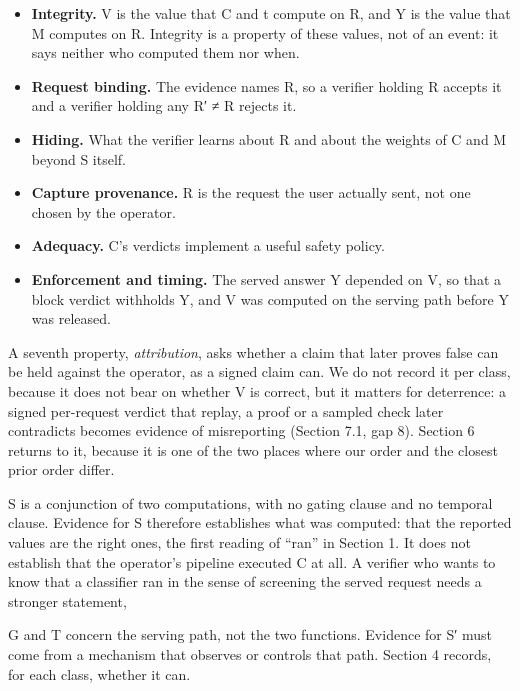 \documentclass[11pt]{article}
\begin{document}
\begin{itemize}
\item \textbf{Integrity.} V is the value that C and t compute on R, and Y is the value that M computes on R. Integrity is a property of these values, not of an event: it says neither who computed them nor when.
\item \textbf{Request binding.} The evidence names R, so a verifier holding R accepts it and a verifier holding any R′ ≠ R rejects it.
\item \textbf{Hiding.} What the verifier learns about R and about the weights of C and M beyond S itself.
\item \textbf{Capture provenance.} R is the request the user actually sent, not one chosen by the operator.
\item \textbf{Adequacy.} C's verdicts implement a useful safety policy.
\item \textbf{Enforcement and timing.} The served answer Y depended on V, so that a block verdict withholds Y, and V was computed on the serving path before Y was released.
\end{itemize}

A seventh property, \emph{attribution}, asks whether a claim that later proves false can be held against the operator, as a signed claim can. We do not record it per class, because it does not bear on whether V is correct, but it matters for deterrence: a signed per-request verdict that replay, a proof or a sampled check later contradicts becomes evidence of misreporting (Section 7.1, gap 8). Section 6 returns to it, because it is one of the two places where our order and the closest prior order differ.

S is a conjunction of two computations, with no gating clause and no temporal clause. Evidence for S therefore establishes what was computed: that the reported values are the right ones, the first reading of ``ran'' in Section 1. It does not establish that the operator's pipeline executed C at all. A verifier who wants to know that a classifier ran in the sense of screening the served request needs a stronger statement,

\begin{center}\end{center}

G and T concern the serving path, not the two functions. Evidence for S′ must come from a mechanism that observes or controls that path. Section 4 records, for each class, whether it can.
\end{document}
